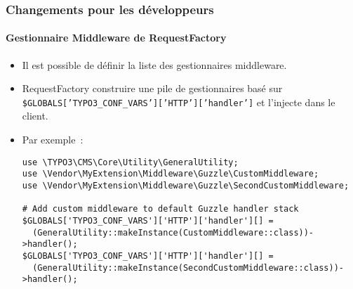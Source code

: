 \begin{frame}[fragile]
	\frametitle{Changements pour les développeurs}
	\framesubtitle{Gestionnaire Middleware de RequestFactory}

	\lstset{basicstyle=\tiny\ttfamily}

	\begin{itemize}
		\item Il est possible de définir la liste des gestionnaires middleware.
		\item RequestFactory construire une pile de gestionnaires basé sur\newline
			\small
				\texttt{\$GLOBALS['TYPO3\_CONF\_VARS']['HTTP']['handler']}
			\normalsize
			et l'injecte dans le client.
		\item Par exemple~:

\begin{lstlisting}
use \TYPO3\CMS\Core\Utility\GeneralUtility;
use \Vendor\MyExtension\Middleware\Guzzle\CustomMiddleware;
use \Vendor\MyExtension\Middleware\Guzzle\SecondCustomMiddleware;

# Add custom middleware to default Guzzle handler stack
$GLOBALS['TYPO3_CONF_VARS']['HTTP']['handler'][] =
  (GeneralUtility::makeInstance(CustomMiddleware::class))->handler();
$GLOBALS['TYPO3_CONF_VARS']['HTTP']['handler'][] =
  (GeneralUtility::makeInstance(SecondCustomMiddleware::class))->handler();
\end{lstlisting}

	\end{itemize}

\end{frame}



